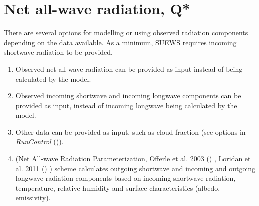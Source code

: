 \documentclass[letterpaper,10pt,english]{sphinxmanual}
\begin{document}
\section{Net all-wave radiation, Q*}
\label{\detokenize{parameterisations-and-sub-models:net-all-wave-radiation-q}}
There are several options for modelling or using observed radiation
components depending on the data available. As a minimum, SUEWS requires
incoming shortwave radiation to be provided.
\begin{enumerate}
\item {} 
Observed net all-wave radiation can be provided as input instead of
being calculated by the model.

\item {} 
Observed incoming shortwave and incoming longwave components can be
provided as input, instead of incoming longwave being calculated by
the model.

\item {} 
Other data can be provided as input, such as cloud fraction (see
options in {\hyperref[\detokenize{parameterisations-and-sub-models:RunControl.nml}]{\emph{RunControl}}} ()).

\item {} 
 (Net All-wave Radiation Parameterization, Offerle et al.
2003 \label{\detokenize{parameterisations-and-sub-models:id1}}{\hyperref[\detokenize{references:o2003}]{\sphinxcrossref{{[}O2003{]}}}} () , Loridan et al. 2011 \label{\detokenize{parameterisations-and-sub-models:id2}}{\hyperref[\detokenize{references:l2011}]{\sphinxcrossref{{[}L2011{]}}}} () ) scheme calculates outgoing
shortwave and incoming and outgoing longwave radiation components
based on incoming shortwave radiation, temperature, relative humidity
and surface characteristics (albedo, emissivity).

\end{enumerate}
\end{document}
